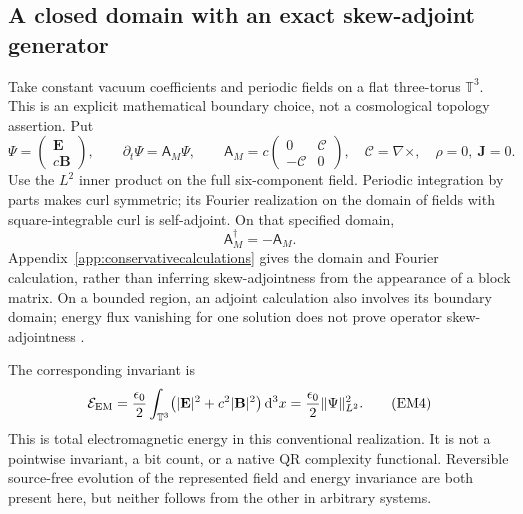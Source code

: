 \subsection{A closed domain with an exact skew-adjoint generator}
Take constant vacuum coefficients and periodic fields on a flat three-torus $\mathbb T^3$. This is an explicit mathematical boundary choice, not a cosmological topology assertion. Put
\begin{equation}
\Psi=\begin{pmatrix}\mathbf E\\c\mathbf B\end{pmatrix},\qquad
\partial_t\Psi=\mathsf A_M\Psi,\qquad
\mathsf A_M=c\begin{pmatrix}0&\mathscr C\\-\mathscr C&0\end{pmatrix},
\quad \mathscr C=\nabla\times,
\quad \rho=0,\ \mathbf J=0.
\tag{EM3}\label{eq:maxwellgenerator}
\end{equation}
Use the $L^2$ inner product on the full six-component field. Periodic integration by parts makes curl symmetric; its Fourier realization on the domain of fields with square-integrable curl is self-adjoint. On that specified domain,
\[
\mathsf A_M^\dagger=-\mathsf A_M.
\]
Appendix~\ref{app:conservativecalculations} gives the domain and Fourier calculation, rather than inferring skew-adjointness from the appearance of a block matrix. On a bounded region, an adjoint calculation also involves its boundary domain; energy flux vanishing for one solution does not prove operator skew-adjointness \citep{ellerkarabash2021}.

The corresponding invariant is
\begin{equation}
\mathcal E_{\rm EM}
=\frac{\epsilon_0}{2}\int_{\mathbb T^3}
\bigl(|\mathbf E|^2+c^2|\mathbf B|^2\bigr)\,\mathrm d^3x
=\frac{\epsilon_0}{2}\|\Psi\|_{L^2}^2.
\tag{EM4}\label{eq:maxwellenergy}
\end{equation}
This is total electromagnetic energy in this conventional realization. It is not a pointwise invariant, a bit count, or a native QR complexity functional. Reversible source-free evolution of the represented field and energy invariance are both present here, but neither follows from the other in arbitrary systems.

